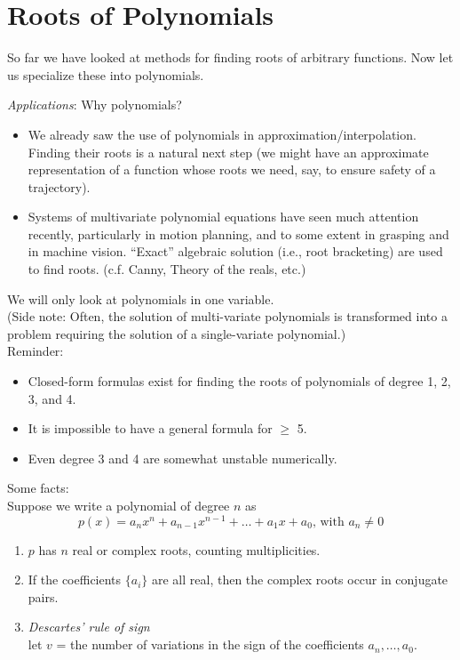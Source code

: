 \chapter{Roots of Polynomials}

So far we have looked at methods for finding roots of arbitrary functions. Now let us specialize these into polynomials. \newline

\noindent \emph{Applications}: Why polynomials?
\begin{itemize}
    \item We already saw the use of polynomials in approximation/interpolation. Finding their roots is a natural next step (we might have an approximate representation of a function whose roots we need, say, to ensure safety of a trajectory).
    \item Systems of multivariate polynomial equations have seen much attention recently, particularly in motion planning, and to some extent in grasping and in machine vision. ``Exact'' algebraic solution (i.e., root bracketing) are used to find roots. (c.f. Canny, Theory of the reals, etc.)
\end{itemize}


\vspace{1em}

\noindent We will only look at polynomials in one variable. \\
(Side note: Often, the solution of multi-variate polynomials is transformed into a problem requiring the solution of a single-variate polynomial.) \\

\noindent Reminder: 
\begin{itemize}
    \item Closed-form formulas exist for finding the roots of polynomials of degree 1, 2, 3, and 4.
    \item It is impossible to have a general formula for $\geq$ 5.
    \item Even degree 3 and 4 are somewhat unstable numerically.
\end{itemize}

\noindent Some facts: \\
Suppose  we write a polynomial of degree $n$ as
$$p(x) = a_n x^n + a_{n-1} x^{n-1} + \dots + a_1 x + a_0\text{, with }a_n \neq 0$$

\begin{enumerate}
    \item $p$ has $n$ real or complex roots, counting multiplicities. \\
    \item If the coefficients $\{ a_i \}$ are all real, then the complex roots occur in conjugate pairs.
    \item \emph{Descartes' rule of sign} \\
        let $v$ = the number of variations in the sign of the coefficients $a_n, \dots, a_0$. 
        
\end{enumerate}

